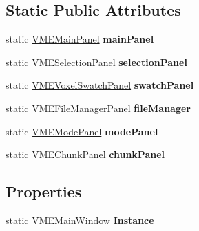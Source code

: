 \subsection*{Static Public Attributes}
\begin{DoxyCompactItemize}
\item 
static \hyperlink{class_v_m_e_1_1_v_m_e_main_panel}{V\+M\+E\+Main\+Panel} {\bfseries main\+Panel}\hypertarget{class_v_m_e_1_1_v_m_e_main_window_a5a853a457bf6f7143c512b4805b39513}{}\label{class_v_m_e_1_1_v_m_e_main_window_a5a853a457bf6f7143c512b4805b39513}

\item 
static \hyperlink{class_v_m_e_1_1_v_m_e_selection_panel}{V\+M\+E\+Selection\+Panel} {\bfseries selection\+Panel}\hypertarget{class_v_m_e_1_1_v_m_e_main_window_a011d9d108ccf55ed948094be1f5841f7}{}\label{class_v_m_e_1_1_v_m_e_main_window_a011d9d108ccf55ed948094be1f5841f7}

\item 
static \hyperlink{class_v_m_e_1_1_v_m_e_voxel_swatch_panel}{V\+M\+E\+Voxel\+Swatch\+Panel} {\bfseries swatch\+Panel}\hypertarget{class_v_m_e_1_1_v_m_e_main_window_a1e940252cb466e5902e34a16daef3eaf}{}\label{class_v_m_e_1_1_v_m_e_main_window_a1e940252cb466e5902e34a16daef3eaf}

\item 
static \hyperlink{class_v_m_e_1_1_v_m_e_file_manager_panel}{V\+M\+E\+File\+Manager\+Panel} {\bfseries file\+Manager}\hypertarget{class_v_m_e_1_1_v_m_e_main_window_a68db00d53ad911e2d516c43a508b6d97}{}\label{class_v_m_e_1_1_v_m_e_main_window_a68db00d53ad911e2d516c43a508b6d97}

\item 
static \hyperlink{class_v_m_e_1_1_v_m_e_mode_panel}{V\+M\+E\+Mode\+Panel} {\bfseries mode\+Panel}\hypertarget{class_v_m_e_1_1_v_m_e_main_window_a5703dc44df6550b49e9f0f534828bddc}{}\label{class_v_m_e_1_1_v_m_e_main_window_a5703dc44df6550b49e9f0f534828bddc}

\item 
static \hyperlink{class_v_m_e_1_1_v_m_e_chunk_panel}{V\+M\+E\+Chunk\+Panel} {\bfseries chunk\+Panel}\hypertarget{class_v_m_e_1_1_v_m_e_main_window_aafe7502daf7d91d2dc40a1593ed782af}{}\label{class_v_m_e_1_1_v_m_e_main_window_aafe7502daf7d91d2dc40a1593ed782af}

\end{DoxyCompactItemize}
\subsection*{Properties}
\begin{DoxyCompactItemize}
\item 
static \hyperlink{class_v_m_e_1_1_v_m_e_main_window}{V\+M\+E\+Main\+Window} {\bfseries Instance}\hypertarget{class_v_m_e_1_1_v_m_e_main_window_ae3d8c72e99a172c27ad5addfc810f903}{}\label{class_v_m_e_1_1_v_m_e_main_window_ae3d8c72e99a172c27ad5addfc810f903}

\end{DoxyCompactItemize}


